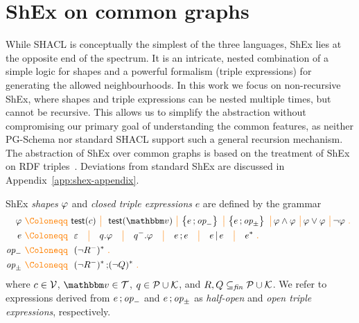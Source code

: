\section{ShEx on common graphs}
\label{sec:shex}

While SHACL is conceptually the simplest of the three languages, ShEx lies at the opposite end of the spectrum. It is an intricate, nested combination of a simple logic for shapes and a powerful formalism (triple expressions) for generating the allowed neighbourhoods. In this work we focus on non-recursive ShEx, where shapes and triple expressions can be nested multiple times, but cannot be recursive.
This allows us to simplify the abstraction without compromising our primary goal of understanding the common features, as neither PG-Schema nor standard SHACL support such a general recursion mechanism.
The abstraction of ShEx over common graphs is based on the treatment of ShEx on RDF triples~\cite{BGP17}. Deviations from standard ShEx are discussed in Appendix~\ref{app:shex-appendix}.

\begin{definition}
\label{def:shex-syntax}
ShEx \emph{shapes} $\mathit{\varphi}$ and
\emph{closed triple expressions} $e$
are defined by the  grammar
\begin{align*}
\se  \gDef & \shexhasvalue(c)
    \gMid
    \ \shextest(\text{$\vtype$})
    \gMid\! \shexneigh{\tte \shexeach \ttclosed }
    \gMid\! \shexneigh{\tte \shexeach \ttopen }
    \gMid\! \se \land \se
    \gMid\! \se \lor \se
    \gMid\! \lnot \se
    \gEnd \\
\tte \gDef &
    \ \varepsilon
    \ \ \gMid \ \
    q.\se
    \ \ \gMid \ \
    \shexinverse q.\se
    \ \ \gMid \ \
    \tte \shexeach \tte
    \ \ \gMid \ \
    \tte \shexone \tte
    \ \ \gMid \ \
    \tte^{*}
  \gEnd \\
  \ttclosed \gDef &\ (\shexneginv{R})^{*} \gEnd \\
\ttopen \gDef &\  (\shexneginv{R})^{*} \shexeach (\shexneg{Q})^{*}  \gEnd
\end{align*}
where $c \in\mathcal{V}$,
$\vtype\in\ValueTypes$, $q \in \mathcal{P} \cup \mathcal{K}$, and $R,Q\subseteq_{\mathit{fin}}\mathcal{P} \cup \mathcal{K}$. We refer to expressions derived from $e \mathop{;} \textit{op}_{-}$ and $e \mathop{;} \textit{op}_{\pm}$ as \emph{half-open} and \emph{open triple expressions}, respectively.
\end{definition}

